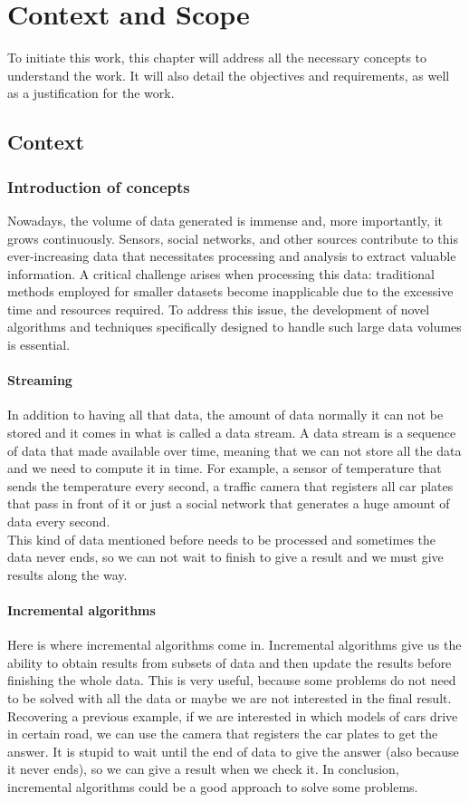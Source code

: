 \chapter{Context and Scope}
To initiate this work, this chapter will address all the necessary concepts to understand the work.
It will also detail the objectives and requirements, as well as a justification for the work.
\section{Context}
\subsection{Introduction of concepts}
Nowadays, the volume of data generated is immense and, more importantly, it grows continuously.
Sensors, social networks, and other sources contribute to this ever-increasing data that necessitates processing and analysis to extract valuable information.
A critical challenge arises when processing this data: traditional methods employed for smaller datasets become inapplicable due to the excessive time and resources required.
To address this issue, the development of novel algorithms and techniques specifically designed to handle such large data volumes is essential.
\subsubsection*{Streaming}
In addition to having all that data, the amount of data normally it can not be stored and it comes in what is called a data stream.
A data stream is a sequence of data that made available over time, meaning that we can not store all the data and we need to compute it in time.
For example, a sensor of temperature that sends the temperature every second, a traffic camera that registers all car plates that pass in front of it or just a social network that generates a huge amount of data every second.\\
This kind of data mentioned before needs to be processed and sometimes the data never ends, so we can not wait to finish to give a result and we must give results along the way.
\subsubsection*{Incremental algorithms}
Here is where incremental algorithms come in.\cite{sharp_incremental_2007}
Incremental algorithms give us the ability to obtain results from subsets of data and then update the results before finishing the whole data.
This is very useful, because some problems do not need to be solved with all the data or maybe we are not interested in the final result.
Recovering a previous example, if we are interested in which models of cars drive in certain road, we can use the camera that registers the car plates to get the answer.
It is stupid to wait until the end of data to give the answer (also because it never ends), so we can give a result when we check it.
In conclusion, incremental algorithms could be a good approach to solve some problems.
